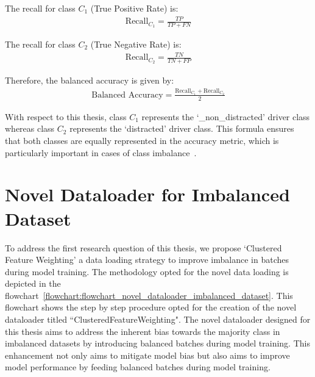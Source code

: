The recall for class \( C_1 \) (True Positive Rate) is:
\begin{equation}
\begin{aligned}
\text{Recall}_{C_1} = \frac{TP}{TP + FN}
\end{aligned}
\label{equation:4.5}
\end{equation}

The recall for class \( C_2 \) (True Negative Rate) is:
\begin{equation}
\begin{aligned}
\text{Recall}_{C_2} = \frac{TN}{TN + FP}
\end{aligned}
\label{equation:4.6}
\end{equation}

Therefore, the balanced accuracy is given by:
\begin{equation}
\begin{aligned}
\text{Balanced Accuracy} = \frac{\text{Recall}_{C_1} + \text{Recall}_{C_2}}{2}
\end{aligned}
\label{equation:4.7}
\end{equation}

With respect to this thesis, class \( C_1 \) represents the `\_non\_distracted' driver class whereas class \(C_2\) represents the `distracted' driver class. This formula ensures that both classes are equally represented in the accuracy metric, which is particularly important in cases of class imbalance~\citep{Survey_DL_Taghi_article, 18_wang2016training}.

\section{Novel Dataloader for Imbalanced Dataset}
To address the first research question of this thesis, we propose `Clustered Feature Weighting' a data loading strategy to improve imbalance in batches during model training. The methodology opted for the novel data loading is depicted in the flowchart~\ref{flowchart:flowchart_novel_dataloader_imbalanced_dataset}. This flowchart shows the step by step procedure opted for the creation of the novel dataloader titled ``ClusteredFeatureWeighting". The novel dataloader designed for this thesis aims to address the inherent bias towards the majority class in imbalanced datasets by introducing balanced batches during model training. This enhancement not only aims to mitigate model bias but also aims to improve model performance by feeding balanced batches during model training.

